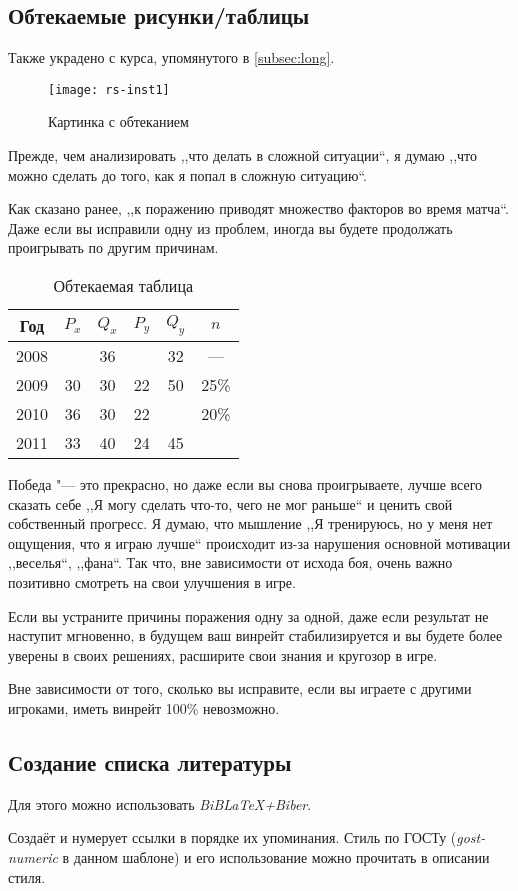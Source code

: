 \subsection{Обтекаемые рисунки/таблицы}
Также украдено с курса, упомянутого в \vref{subsec:long}. ~\\

\begin{wrapfigure}{l}{0.5\linewidth}
	\texttt{[image: rs-inst1]}
	\caption{Картинка с обтеканием}
\end{wrapfigure}
Прежде, чем анализировать ,,что делать в сложной ситуации``, я думаю ,,что можно сделать до того, как я попал в сложную ситуацию``. 

Как сказано ранее, ,,к поражению приводят множество факторов во время матча``. Даже если вы исправили одну из проблем, иногда вы будете продолжать проигрывать по другим причинам.

\begin{wraptable}{r}{0.5\linewidth}
	\centering
	\begin{tabular}{|c|c|c|c|c|c|}
		\hline
		Год  & $P_x$ & $Q_x$ & $P_y$ & $Q_y$ & $n$  \\ \hline
		2008 &       & 36    &       & 32    & — 	\\ \hline
		2009 & 30    & 30    & 22    & 50    & 25\% \\ \hline
		2010 & 36    & 30    & 22    &       & 20\% \\ \hline
		2011 & 33    & 40    & 24    & 45    & 		\\ \hline
	\end{tabular}
	\caption{Обтекаемая таблица}
\end{wraptable}
Победа "--- это прекрасно, но даже если вы снова проигрываете, лучше всего сказать себе ,,Я могу сделать что-то, чего не мог раньше`` и ценить свой собственный прогресс.
Я думаю, что мышление ,,Я тренируюсь, но у меня нет ощущения, что я играю лучше`` происходит из-за нарушения основной мотивации ,,веселья``, ,,фана``. Так что, вне зависимости от исхода боя, очень важно позитивно смотреть на свои улучшения в игре.

Если вы устраните причины поражения одну за одной, даже если результат не наступит мгновенно, в будущем ваш винрейт стабилизируется и вы будете более уверены в своих решениях, расширите свои знания и кругозор в игре.

Вне зависимости от того, сколько вы исправите, если вы играете с другими игроками, иметь винрейт 100\% невозможно.

\subsection{Создание списка литературы}

Для этого можно использовать \emph{BiBLaTeX+Biber}.\cite{biblatex}

Создаёт и нумерует ссылки в порядке их упоминания.\cite{modelcheck} Стиль по ГОСТу (\emph{gost-numeric} в данном шаблоне) и его использование можно прочитать в описании стиля.\cite{gost}